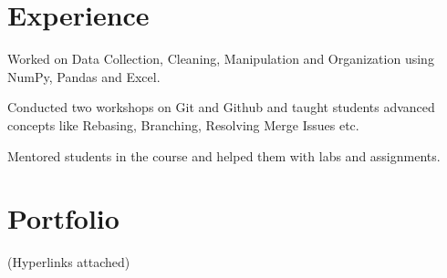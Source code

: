 \documentclass[]{m abbas resume' 2022}
\begin{document}
\begin{minipage}[t]{0.45\textwidth} 
    

    
\section{Experience}
\vspace{\topsep} %
\begin{tightemize}
\sectionsep
\item Worked on Data Collection, Cleaning, Manipulation and Organization using
    NumPy, Pandas and Excel.
\end{tightemize}  
  

\begin{tightemize}
\item Conducted two workshops on Git and Github and taught students advanced
    concepts like Rebasing, Branching, Resolving Merge Issues etc.
\end{tightemize}  

\begin{tightemize}
\item Mentored students in the course and helped them
    with labs and assignments.
\end{tightemize}  


\section{Portfolio} 
    (Hyperlinks attached)


\end{minipage}
\end{document}
